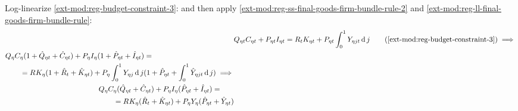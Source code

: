 \documentclass[../thesis.tex]{subfiles}
\begin{document}
Log-linearize \ref{ext-mod:reg-budget-constraint-3}: and then apply \ref{ext-mod:reg-ss-final-goods-firm-bundle-rule-2} and \ref{ext-mod:reg-ll-final-goods-firm-bundle-rule}:
\begin{align}
	& Q_{\eta t} C_{\eta t} + P_{\eta t} I_{\eta t} = R_{t} K_{\eta t} + P_{\eta t} \int_{0}^{1} Y_{\eta jt} \dif j \tag{\ref{ext-mod:reg-budget-constraint-3}} \implies \\
	\begin{split}
	& Q_{\eta} C_{\eta} (1 + \hat{Q}_{\eta t} + \hat{C}_{\eta t}) + P_{\eta} I_{\eta} (1 + \hat{P}_{\eta t} + \hat{I}_{\eta t}) = \\
	& \qquad = R_{} K_{\eta} (1 + \hat{R}_{t} + \hat{K}_{\eta t}) + P_{\eta} \int_{0}^{1} Y_{\eta j} \dif j (1 + \hat{P}_{\eta t} + \int_{0}^{1} \hat{Y}_{\eta jt} \dif j) \implies	
	\end{split} \nonumber \\
	\begin{split}
		& Q_{\eta} C_{\eta} (\hat{Q}_{\eta t} + \hat{C}_{\eta t}) + P_{\eta} I_{\eta} (\hat{P}_{\eta t} + \hat{I}_{\eta t}) = \\
		& \qquad = R_{} K_{\eta} (\hat{R}_{t} + \hat{K}_{\eta t}) + P_{\eta} Y_{\eta} (\hat{P}_{\eta t} + \hat{Y}_{\eta t})
	\end{split} \label{ext-mod:reg-ll-budget-constraint-3}
\end{align}
\end{document}
